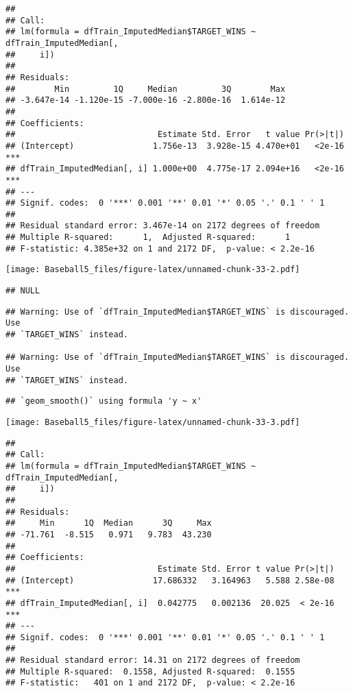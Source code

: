 \documentclass[
]{article}
\begin{document}
\begin{verbatim}
## 
## Call:
## lm(formula = dfTrain_ImputedMedian$TARGET_WINS ~ dfTrain_ImputedMedian[, 
##     i])
## 
## Residuals:
##        Min         1Q     Median         3Q        Max 
## -3.647e-14 -1.120e-15 -7.000e-16 -2.800e-16  1.614e-12 
## 
## Coefficients:
##                             Estimate Std. Error   t value Pr(>|t|)    
## (Intercept)                1.756e-13  3.928e-15 4.470e+01   <2e-16 ***
## dfTrain_ImputedMedian[, i] 1.000e+00  4.775e-17 2.094e+16   <2e-16 ***
## ---
## Signif. codes:  0 '***' 0.001 '**' 0.01 '*' 0.05 '.' 0.1 ' ' 1
## 
## Residual standard error: 3.467e-14 on 2172 degrees of freedom
## Multiple R-squared:      1,  Adjusted R-squared:      1 
## F-statistic: 4.385e+32 on 1 and 2172 DF,  p-value: < 2.2e-16
\end{verbatim}

\texttt{[image: Baseball5\_files/figure-latex/unnamed-chunk-33-2.pdf]}

\begin{verbatim}
## NULL
\end{verbatim}

\begin{verbatim}
## Warning: Use of `dfTrain_ImputedMedian$TARGET_WINS` is discouraged. Use
## `TARGET_WINS` instead.

## Warning: Use of `dfTrain_ImputedMedian$TARGET_WINS` is discouraged. Use
## `TARGET_WINS` instead.
\end{verbatim}

\begin{verbatim}
## `geom_smooth()` using formula 'y ~ x'
\end{verbatim}

\texttt{[image: Baseball5\_files/figure-latex/unnamed-chunk-33-3.pdf]}

\begin{verbatim}
## 
## Call:
## lm(formula = dfTrain_ImputedMedian$TARGET_WINS ~ dfTrain_ImputedMedian[, 
##     i])
## 
## Residuals:
##     Min      1Q  Median      3Q     Max 
## -71.761  -8.515   0.971   9.783  43.230 
## 
## Coefficients:
##                             Estimate Std. Error t value Pr(>|t|)    
## (Intercept)                17.686332   3.164963   5.588 2.58e-08 ***
## dfTrain_ImputedMedian[, i]  0.042775   0.002136  20.025  < 2e-16 ***
## ---
## Signif. codes:  0 '***' 0.001 '**' 0.01 '*' 0.05 '.' 0.1 ' ' 1
## 
## Residual standard error: 14.31 on 2172 degrees of freedom
## Multiple R-squared:  0.1558, Adjusted R-squared:  0.1555 
## F-statistic:   401 on 1 and 2172 DF,  p-value: < 2.2e-16
\end{verbatim}
\end{document}
